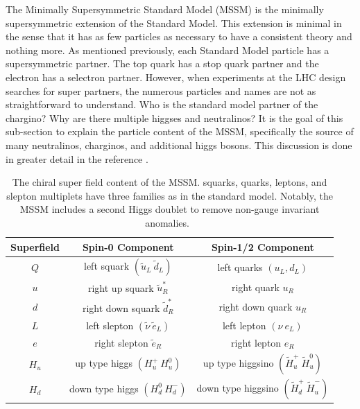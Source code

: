 The Minimally Supersymmetric Standard Model (MSSM) is the minimally supersymmetric extension of the
Standard Model. This extension is minimal in the sense that it has as few particles as necessary to 
have a consistent theory and nothing more. As mentioned previously, each Standard Model particle
has a supersymmetric partner. The top quark has a stop quark partner and the electron has a selectron
partner. However, when experiments at the LHC design searches for super partners, the
numerous particles and names are not as straightforward to understand. Who is the standard model
partner of the chargino? Why are there multiple higgses and neutralinos? 
It is the goal of this sub-section to explain the particle content of the MSSM, specifically the source
of many neutralinos, charginos, and additional higgs bosons. This discussion is done 
in greater detail in the reference \cite{meike}.

\begin{table}[tb]
\caption{The chiral super field content of the MSSM. squarks, quarks, leptons, and slepton multiplets
have three families as in the standard model. Notably, the MSSM includes a second Higgs doublet to remove
non-gauge invariant anomalies.~\label{tab:mssmmatter}}
\begin{center}
\begin{tabular}{ccc}
\textbf{Superfield} & \textbf{Spin-0 Component} & \textbf{Spin-1/2 Component} \\
\hline
$Q$  & left squark $(\tilde{u}_L ~ \tilde{d}_L)$ & left  quarks $(u_L, d_L)$ \\
$u$ & right up squark $\tilde{u}_R^*$ & right quark $u_R$ \\
$d$ & right down squark $\tilde{d}_R^*$ & right down quark $u_R$ \\
$L$ & left slepton $(\tilde{\nu}~\tilde{e}_L)$ & left lepton $(\nu~e_L)$\\
$e$ & right slepton $\tilde{e}_R$ & right lepton $e_R$ \\
$H_u$ & up type higgs $(H_u^+ ~ H_u^0)$ & up type higgsino $(\tilde{H}_u^+ ~ \tilde{H}_u^0)$\\
$H_d$ & down type higgs $(H_d^0 ~ H_d^-)$ & down type higgsino $(\tilde{H}_d^+ ~ \tilde{H}_u^-)$\\
\end{tabular} 
\end{center}
\end{table}

